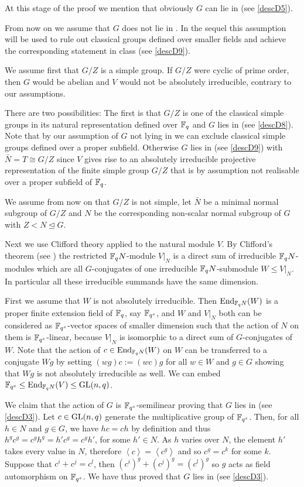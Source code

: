 At this stage of the proof we mention that obviously $G$ can lie
in  (see \ref{descD5}).

From now on we assume that $G$ does not lie in . In the sequel this 
assumption will be used to rule out classical groups defined over
smaller fields and achieve the corresponding statement in class 
(see \ref{descD9}).

We assume first that $G/Z$ is a simple group. If $G/Z$ were cyclic of prime 
order, then $G$ would be abelian and $V$ would not be absolutely
irreducible, contrary to our assumptions.

There are two possibilities:
The first is that $G/Z$ is one of the
classical simple groups in its natural representation defined over $\mathbb{F}_q$
and $G$ lies in  (see
\ref{descD8}). Note that by our assumption of $G$ not lying in  we can
exclude classical simple groups defined over a proper subfield. Otherwise
$G$ lies in  (see \ref{descD9}) with
$\bar N =T \cong G/Z$ since $V$ gives rise to an absolutely irreducible
projective representation of the finite simple group $G/Z$ that
is by assumption not realisable over a proper subfield of $\mathbb{F}_q$.

We assume from now on that $G/Z$ is not simple, let $\bar N$
be a minimal normal subgroup of $G/Z$ and $N$ be
the corresponding non-scalar normal subgroup of $G$ with $Z < N
\unlhd G$.

Next we use Clifford theory applied to the natural module $V$. By Clifford's
theorem (see \cite[(49.2) and (49.7)]{CR0}) the restricted $\mathbb{F}_q N$-module
$V|_N$ is a direct sum of irreducible $\mathbb{F}_q N$-modules which are all
$G$-conjugates of one irreducible $\mathbb{F}_q N$-submodule $W \le V|_N$. In
particular all these irreducible summands have the same dimension. 

First we assume that $W$ is not absolutely irreducible.
Then $\End_{\F_q N}(W)$ is a proper finite
extension field of $\mathbb{F}_q$, say $\mathbb{F}_{q^s}$, and $W$ and $V|_N$
both can be considered as $\mathbb{F}_{q^s}$-vector spaces of smaller dimension
such that the action of
$N$ on them is $\mathbb{F}_{q^s}$-linear, because $V|_N$ is isomorphic to a direct
sum of $G$-conjugates of $W$. Note that the action of $c \in \End_{\F_q
N}(W)$ on $W$ can be transferred to a conjugate $Wg$ by setting
$(wg)c := (wc)g$ for all $w \in W$ and $g \in G$ showing that $Wg$ is
not absolutely irreducible as well.  
We can embed $\F_{q^s} \le \End_{\F_q N}(V) \le \GL(n,q)$.

We claim that the action of $G$ is $\mathbb{F}_{q^s}$-semilinear proving that $G$ lies
in  (see \ref{descD3}). Let $c \in \GL(n,q)$ generate the
multiplicative group of $\mathbb{F}_{q^s}$. Then, for all $h \in N$ and $g
\in G$, we have $hc=ch$ by definition and thus $h^g c^g = c^g h^g =
h' c^g = c^g h'$, for some $h' \in N$. As $h$ varies over $N$, the
element $h'$ takes every value in $N$, therefore $\left< c \right>
= \left< c^g \right>$ and so $c^g = c^k$ for some $k$. Suppose that
$c^i + c^j = c^l$, then $(c^i)^g + (c^j)^g = (c^l)^g$ so $g$ acts as
field automorphism on $\mathbb{F}_{q^s}$. We have thus proved that $G$ 
lies in  (see \ref{descD3}).

